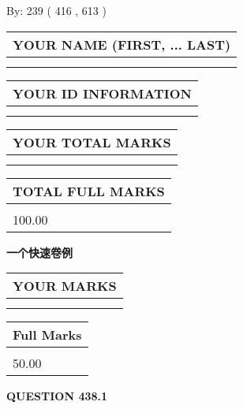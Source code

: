 \documentclass{ctexart}
\begin{document}
   
\hspace{1.0in} By: 
 239 ( 416 ,  613 )
   
   
   
   
\newpage 
\setcounter{page}{ 
   438001 } 
   
   
   
   
\noindent\begin{tabular}{|l|}
\hline
YOUR NAME (FIRST, ... LAST)  \\
\hline
 \\ 
 \\ 
\hline
\end{tabular}
\hspace{0.05in} \begin{tabular}{|l|}
\hline
 YOUR   ID   INFORMATION  \\
\hline
 \\ 
 \\ 
\hline
\end{tabular}
   
   
\vspace{0.2in}\noindent\begin{tabular}{|l|}
\hline
YOUR TOTAL MARKS  \\
\hline
 \\ 
 \\ 
\hline
\end{tabular}
\hspace{0.05in} \begin{tabular}{|l|}
\hline
TOTAL FULL MARKS  \\
\hline
 \\ 
100.00 \\
\hline
\end{tabular}
   
   
 \vspace{0.2in}
{\LARGE {\textbf{ 一个快速卷例}}}
   
   
  
\vspace{0.2in}
  
\noindent\begin{tabular}{|l|}
\hline
 YOUR MARKS  \\
\hline
 \\ 
 \\ 
\hline
\end{tabular}
\hspace{0.05in} \begin{tabular}{|l|}
\hline
 Full Marks  \\
\hline
 \\ 
50.00 \\
\hline
\end{tabular}
{\textbf{\Large{QUESTION
438.1 
}}}
  
\end{document}
